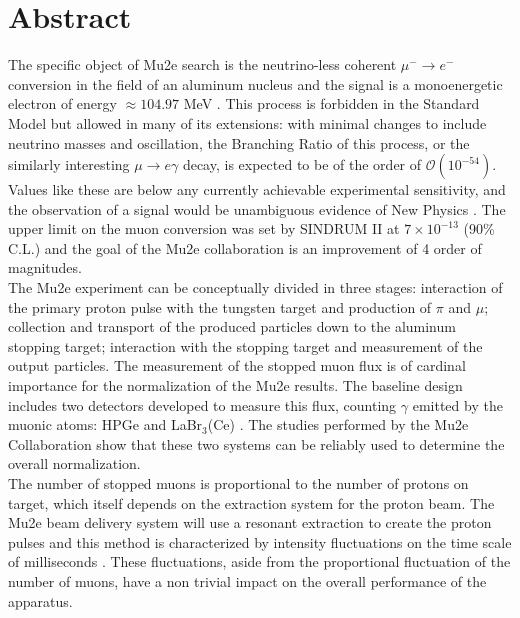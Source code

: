 \documentclass[12pt,a4paper,openright, oneside, titlepage]{book} %
\begin{document}
\chapter*{\centering Abstract}
\begin{changemargin}{1cm}{1cm}
The specific object of Mu2e search is  the neutrino-less coherent $\mu^-\rightarrow e^-$ conversion in the field of an aluminum nucleus and the signal is a monoenergetic electron of energy $ \approx 104.97$ MeV \cite{MTDR}.
This process is forbidden in the Standard Model but allowed in many of its extensions: with minimal changes to include neutrino masses and oscillation, the Branching Ratio of this process, or the similarly interesting $\mu\rightarrow e \gamma$ decay, is expected to be of the order of $\mathcal{O}(10^{-54})$.
Values like these are below any currently achievable experimental sensitivity, and the observation of a signal would be unambiguous evidence of New Physics \cite{signorelli}.
The upper limit on the muon conversion was set by SINDRUM II at $7\times10^{-13}$ (90\% C.L.) \cite{SINDRUMII} and the goal of the Mu2e collaboration is an improvement of 4 order of magnitudes.\\
The Mu2e experiment can be conceptually divided in three stages: interaction of the primary proton pulse with the tungsten target and production of $\pi$ and $\mu$; collection and transport of the produced particles down to the aluminum stopping target; interaction with the stopping target and measurement of the output particles.
The measurement of the stopped muon flux is of cardinal importance for the normalization of the Mu2e results.
The baseline design includes two detectors developed to measure this flux, counting $\gamma$ emitted by the muonic atoms: HPGe and LaBr$_3$(Ce) \cite{STM:2016}\cite{LaBr3:2020}.
The studies performed by the Mu2e Collaboration show that these two systems can be reliably used to determine the overall normalization.\\
The number of stopped muons is proportional to the number of protons on target, which itself depends on the extraction system for the proton beam. 
The Mu2e beam delivery system will use a resonant extraction to create the proton pulses and this method is characterized by intensity fluctuations on the time scale of milliseconds \cite{SpillSim}. 
These fluctuations, aside from the proportional fluctuation of the number of muons, have a non trivial impact on the overall performance of the apparatus. 

\end{changemargin}
\end{document}
